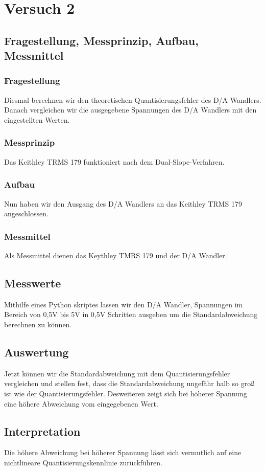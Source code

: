 \documentclass[TGAI_Laborbericht.tex]{subfiles}
\begin{document}
\chapter{Versuch 2}
\label{chap:VERSUCH_2}


\section{Fragestellung, Messprinzip, Aufbau, Messmittel}
\label{chap:VERSUCH_2_FRAGESTELLUNG}
\subsection{Fragestellung}
Diesmal berechnen wir den theoretischen Quantisierungsfehler des D/A Wandlers. Danach vergleichen wir die ausgegebene Spannungen des D/A Wandlers mit den eingestellten Werten.
\subsection{Messprinzip}
Das Keithley TRMS 179 funktioniert nach dem Dual-Slope-Verfahren.

\subsection{Aufbau}
Nun haben wir den Ausgang des D/A Wandlers an das Keithley TRMS 179 angeschlossen.

\subsection{Messmittel}
Als Messmittel dienen das Keythley TMRS 179 und der D/A Wandler.

\section{Messwerte}
\label{chap:VERSUCH_2_MESSWERTE}
Mithilfe eines Python skriptes lassen wir den D/A Wandler, Spannungen im Bereich von 0,5V bis 5V in 0,5V Schritten ausgeben um die Standardabweichung berechnen zu können.  

\section{Auswertung}
\label{chap:VERSUCH_2_AUSWERTUNG}
Jetzt können wir die Standardabweichung mit dem Quantisierungsfehler vergleichen und stellen fest, dass die Standardabweichung ungefähr halb so groß ist wie der Quantisierungsfehler. Desweiteren zeigt sich bei höherer Spannung eine höhere Abweichung vom eingegebenen Wert.

\section{Interpretation}
\label{chap:VERSUCH_2_INTERPRETATION}
Die höhere Abweichung bei höherer Spannung lässt sich vermutlich auf eine nichtlineare Quantisierungskennlinie zurückführen.
\end{document}
